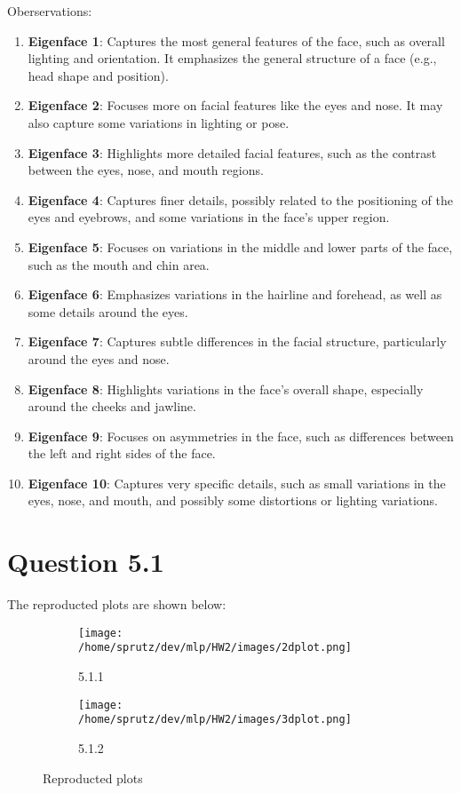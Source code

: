 \documentclass{article}
\begin{document}
\noindent Oberservations:
\begin{enumerate}
    \item \textbf{Eigenface 1}: Captures the most general features of the face, such as overall lighting and orientation. It emphasizes the general structure of a face (e.g., head shape and position).
    \item \textbf{Eigenface 2}: Focuses more on facial features like the eyes and nose. It may also capture some variations in lighting or pose.
    \item \textbf{Eigenface 3}: Highlights more detailed facial features, such as the contrast between the eyes, nose, and mouth regions.
    \item \textbf{Eigenface 4}: Captures finer details, possibly related to the positioning of the eyes and eyebrows, and some variations in the face's upper region.
    \item \textbf{Eigenface 5}: Focuses on variations in the middle and lower parts of the face, such as the mouth and chin area.
    \item \textbf{Eigenface 6}: Emphasizes variations in the hairline and forehead, as well as some details around the eyes.
    \item \textbf{Eigenface 7}: Captures subtle differences in the facial structure, particularly around the eyes and nose.
    \item \textbf{Eigenface 8}: Highlights variations in the face's overall shape, especially around the cheeks and jawline.
    \item \textbf{Eigenface 9}: Focuses on asymmetries in the face, such as differences between the left and right sides of the face.
    \item \textbf{Eigenface 10}: Captures very specific details, such as small variations in the eyes, nose, and mouth, and possibly some distortions or lighting variations.
\end{enumerate}

\newpage
\section*{Question 5.1}
The reproducted plots are shown below:\\
\begin{figure}[h]
    \centering
    \begin{subfigure}[b]{0.45\textwidth}
        \centering
        \texttt{[image: /home/sprutz/dev/mlp/HW2/images/2dplot.png]}
        \caption{5.1.1}
    \end{subfigure}
    \begin{subfigure}[b]{0.45\textwidth}
        \centering
        \texttt{[image: /home/sprutz/dev/mlp/HW2/images/3dplot.png]}
        \caption{5.1.2}
    \end{subfigure}
    \caption{Reproducted plots}
\end{figure}
\end{document}
